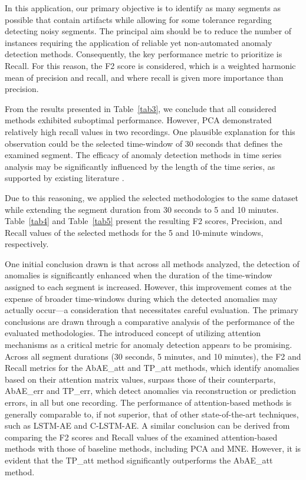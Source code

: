 \documentclass[conference]{IEEEtran}
\begin{document}
In this application, our primary objective is to identify as many segments as possible that contain artifacts while allowing for some tolerance regarding detecting noisy segments. The principal aim should be to reduce the number of instances requiring the application of reliable yet non-automated anomaly detection methods. Consequently, the key performance metric to prioritize is Recall. For this reason, the F2 score is considered, which is a weighted harmonic mean of precision and recall, and where recall is given more importance than precision.

From the results presented in Table~\ref{tab3}, we conclude that all considered methods exhibited suboptimal performance. However, PCA demonstrated relatively high recall values in two recordings. One plausible explanation for this observation could be the selected time-window of 30 seconds that defines the examined segment. The efficacy of anomaly detection methods in time series analysis may be significantly influenced by the length of the time series, as supported by existing literature \cite{Lee_2021}.

Due to this reasoning, we applied the selected methodologies to the same dataset while extending the segment duration from 30 seconds to 5 and 10 minutes. Table~\ref{tab4} and Table~\ref{tab5} present the resulting F2 scores, Precision, and Recall values of the selected methods for the 5 and 10-minute windows, respectively. 

One initial conclusion drawn is that across all methods analyzed, the detection of anomalies is significantly enhanced when the duration of the time-window assigned to each segment is increased. However, this improvement comes at the expense of broader time-windows during which the detected anomalies may actually occur---a consideration that necessitates careful evaluation. 
The primary conclusions are drawn through a comparative analysis of the performance of the evaluated methodologies. The introduced concept of utilizing attention mechanisms as a critical metric for anomaly detection appears to be promising. Across all segment durations (30 seconds, 5 minutes, and 10 minutes), the F2 and Recall metrics for the AbAE\_att and TP\_att methods, which identify anomalies based on their attention matrix values, surpass those of their counterparts, AbAE\_err and TP\_err, which detect anomalies via reconstruction or prediction errors, in all but one recording.
The performance of attention-based methods is generally comparable to, if not superior, that of other state-of-the-art techniques, such as LSTM-AE and C-LSTM-AE. A similar conclusion can be derived from comparing the F2 scores and Recall values of the examined attention-based methods with those of baseline methods, including PCA and MNE. However, it is evident that the TP\_att method significantly outperforms the AbAE\_att method.
\end{document}
